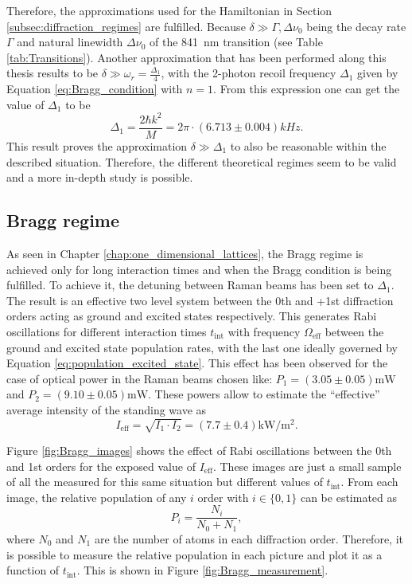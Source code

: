 Therefore, the approximations used for the Hamiltonian in Section \ref{subsec:diffraction_regimes} are fulfilled. Because $\delta \gg \Gamma, \Delta\nu_0$ being the decay rate $\Gamma$ and natural linewidth $\Delta\nu_0$ of the \SI{841}{\nano\meter} transition (see Table \ref{tab:Transitions}). Another approximation that has been performed along this thesis results to be $\delta \gg \omega_r = \frac{\Delta_1}{4}$, with the 2-photon recoil frequency $\Delta_1$ given by Equation \eqref{eq:Bragg_condition} with $n=1$. From this expression one can get the value of $\Delta_1$ to be
\begin{equation*}
	\Delta_1 = \frac{2\hbar k^2}{M} = 2\pi \cdot (6.713 \pm 0.004)\si{kHz}.
\end{equation*}
This result proves the approximation $\delta \gg \Delta_1$ to also be reasonable within the described situation. Therefore, the different theoretical regimes seem to be valid and a more in-depth study is possible.

\subsection{Bragg regime}

As seen in Chapter \ref{chap:one_dimensional_lattices}, the Bragg regime is achieved only for long interaction times and when the Bragg condition is being fulfilled. To achieve it, the detuning between Raman beams has been set to $\Delta_1$. The result is an effective two level system between the 0th and +1st diffraction orders acting as ground and excited states respectively. This generates Rabi oscillations for different interaction times $t_\text{int}$ with frequency $\Omega_\text{eff}$ between the ground and excited state population rates, with the last one ideally governed by Equation \ref{eq:population_excited_state}. This effect has been observed for the case of optical power in the Raman beams chosen like: $P_1 = (3.05 \pm 0.05)\si{\milli\watt}$ and $P_2 = (9.10 \pm 0.05)\si{\milli\watt}$. These powers allow to estimate the ``effective'' average intensity of the standing wave as
\begin{equation*}
	I_\text{eff} = \sqrt{I_1\cdot I_2} = (7.7 \pm 0.4)\si{\kilo\watt\per\meter\squared}.
\end{equation*} 

Figure \ref{fig:Bragg_images} shows the effect of Rabi oscillations between the 0th and 1st orders for the exposed value of $I_\text{eff}$. These images are just a small sample of all the measured for this same situation but different values of $t_\text{int}$. From each image, the relative population of any $i$ order with $i \in \{0,1\}$ can be estimated as
\begin{equation}
	P_i = \frac{N_i}{N_0+N_1},
\end{equation}
where $N_0$ and $N_1$ are the number of atoms in each diffraction order. Therefore, it is possible to measure the relative population in each picture and plot it as a function of $t_\text{int}$. This is shown in Figure \ref{fig:Bragg_measurement}.

